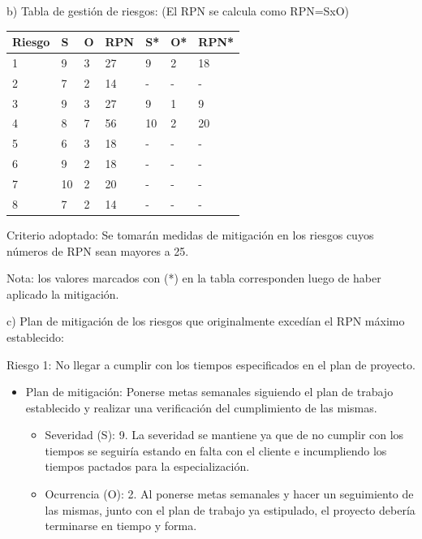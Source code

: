 \documentclass[11pt]{charter}
\begin{document}
b) Tabla de gestión de riesgos:      (El RPN se calcula como RPN=SxO)

\begin{table}[htpb]
\centering
\begin{tabularx}{\linewidth}{@{}|X|X|X|X|X|X|X|@{}}
\hline
\rowcolor[HTML]{C0C0C0} 
Riesgo & S & O & RPN & S* & O* & RPN* \\ \hline
    1  & 9 & 3 & \cellcolor[HTML]{F33B01} 27 &  9  &  2  & \cellcolor[HTML]{4EF301} 18     \\ \hline
    2  & 7 & 2 & \cellcolor[HTML]{4EF301} 14 &  -  &  -  & -     \\ \hline
    3  & 9 & 3 & \cellcolor[HTML]{F33B01} 27 &  9  &  1  &\cellcolor[HTML]{4EF301} 9     \\ \hline
    4  & 8 & 7 & \cellcolor[HTML]{F33B01} 56 &  10  & 2   & \cellcolor[HTML]{4EF301} 20     \\ \hline
    5  & 6 & 3 & \cellcolor[HTML]{4EF301} 18 &  -  & -   & -     \\ \hline
    6  & 9 & 2 & \cellcolor[HTML]{4EF301} 18 &  -  & -   & -     \\ \hline
    7  & 10 & 2 & \cellcolor[HTML]{4EF301}20 &  -  &  -  &   -   \\ \hline
    8  & 7 & 2 & \cellcolor[HTML]{4EF301} 14 &  -  &  -  &   -   \\ \hline
\end{tabularx}%
\end{table}

Criterio adoptado: 
Se tomarán medidas de mitigación en los riesgos cuyos números de RPN sean mayores a 25.

Nota: los valores marcados con (*) en la tabla corresponden luego de haber aplicado la mitigación.

c) Plan de mitigación de los riesgos que originalmente excedían el RPN máximo establecido:
 
Riesgo 1: No llegar a cumplir con los tiempos especificados en el plan de proyecto.
\begin{itemize}
\item Plan de mitigación: Ponerse metas semanales siguiendo el plan de trabajo establecido y realizar una verificación del cumplimiento de las mismas.
	\begin{itemize}
	\item Severidad (S): 9. La severidad se mantiene ya que de no cumplir con los tiempos se seguiría estando en falta con el cliente e incumpliendo los tiempos pactados para la especialización.
	\item Ocurrencia (O): 2. Al ponerse metas semanales y hacer un seguimiento de las mismas, junto con el plan de trabajo ya estipulado, el proyecto debería terminarse en tiempo y forma.
	\end{itemize}
\end{itemize}
\end{document}
